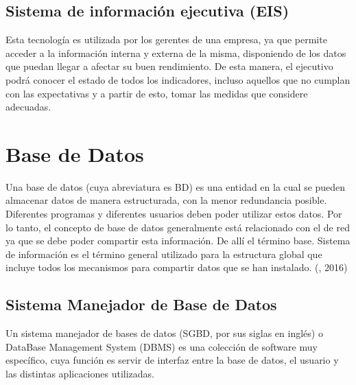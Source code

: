



\setlength{\parskip}{0mm}

\subsection{Sistema de información ejecutiva (EIS)}
\setlength{\parskip}{5mm}
 Esta tecnología es utilizada por los gerentes de una empresa, ya que permite acceder a la información interna y externa de la misma, disponiendo de los datos que puedan llegar a afectar su buen rendimiento.
De esta manera, el ejecutivo podrá conocer el estado de todos los indicadores, incluso aquellos que no cumplan con las expectativas y a partir de esto, tomar las medidas que considere adecuadas.
\setlength{\parskip}{0mm}




\section{Base de Datos} 	
\setlength{\parskip}{5mm}
Una base de datos (cuya abreviatura es BD) es una entidad en la cual se pueden almacenar datos de manera estructurada, con la menor redundancia posible. Diferentes programas y diferentes usuarios deben poder utilizar estos datos. Por lo tanto, el concepto de base de datos generalmente está relacionado con el de red ya que se debe poder compartir esta información. De allí el término base. Sistema de información es el término general utilizado para la estructura global que incluye todos los mecanismos para compartir datos que se han instalado. (\citet{bdbib}, 2016) 


\setlength{\parskip}{0mm}



\subsection{Sistema Manejador de Base de Datos}
\setlength{\parskip}{5mm}
Un sistema manejador de bases de datos (SGBD, por sus siglas en inglés) o DataBase Management System (DBMS) es una colección de software muy específico, cuya función es servir de interfaz entre la base de datos, el usuario y las distintas aplicaciones utilizadas.

